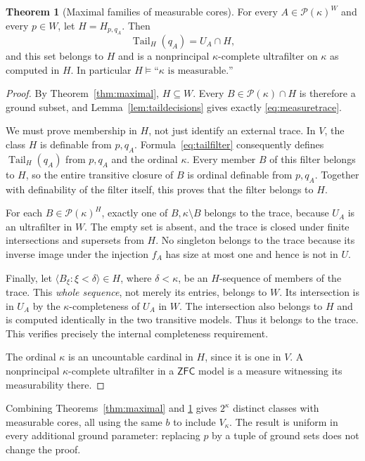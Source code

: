 \documentclass[11pt,letterpaper]{article}
\theoremstyle{definition}
\newtheorem{theorem}[definition]{Theorem}
\numberwithin{equation}{section}
\newcommand{\ZFC}{\mathsf{ZFC}}
\newcommand{\Pow}{\mathcal P}
\newcommand{\tail}{\operatorname{Tail}}
\begin{document}
\begin{theorem}[Maximal families of measurable cores]\label{thm:measurablecores}
For every $A\in\Pow(\kappa)^W$ and every $p\in W$, let $H=H_{p,q_A}$. Then
\begin{equation}\label{eq:measuretrace}
\tail_H(q_A)=U_A\cap H,
\end{equation}
and this set belongs to $H$ and is a nonprincipal $\kappa$-complete ultrafilter on $\kappa$ as computed in $H$. In particular $H\models\text{``$\kappa$ is measurable.''}$
\end{theorem}
\begin{proof}
By Theorem~\ref{thm:maximal}, $H\subseteq W$. Every $B\in\Pow(\kappa)\cap H$ is therefore a ground subset, and Lemma~\ref{lem:taildecisions} gives exactly \eqref{eq:measuretrace}.

We must prove membership in $H$, not just identify an external trace. In $V$, the class $H$ is definable from $p,q_A$. Formula~\eqref{eq:tailfilter} consequently defines $\tail_H(q_A)$ from $p,q_A$ and the ordinal $\kappa$. Every member $B$ of this filter belongs to $H$, so the entire transitive closure of $B$ is ordinal definable from $p,q_A$. Together with definability of the filter itself, this proves that the filter belongs to $H$.

For each $B\in\Pow(\kappa)^H$, exactly one of $B,\kappa\setminus B$ belongs to the trace, because $U_A$ is an ultrafilter in $W$. The empty set is absent, and the trace is closed under finite intersections and supersets from $H$. No singleton belongs to the trace because its inverse image under the injection $f_A$ has size at most one and hence is not in $U$.

Finally, let $\langle B_\xi:\xi<\delta\rangle\in H$, where $\delta<\kappa$, be an $H$-sequence of members of the trace. This \emph{whole sequence}, not merely its entries, belongs to $W$. Its intersection is in $U_A$ by the $\kappa$-completeness of $U_A$ in $W$. The intersection also belongs to $H$ and is computed identically in the two transitive models. Thus it belongs to the trace. This verifies precisely the internal completeness requirement.

The ordinal $\kappa$ is an uncountable cardinal in $H$, since it is one in $V$. A nonprincipal $\kappa$-complete ultrafilter in a $\ZFC$ model is a measure witnessing its measurability there.
\end{proof}

Combining Theorems~\ref{thm:maximal} and \ref{thm:measurablecores} gives $2^\kappa$ distinct classes with measurable cores, all using the same $b$ to include $V_\kappa$. The result is uniform in every additional ground parameter: replacing $p$ by a tuple of ground sets does not change the proof.
\end{document}
